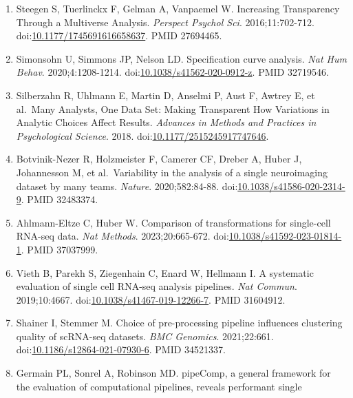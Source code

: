 \documentclass{article}
\begin{document}
\begin{enumerate}
  Simmons JP, Nelson LD, Simonsohn U. False-positive psychology:
  undisclosed flexibility in data collection and analysis allows
  presenting anything as significant. \emph{Psychol Sci}.
  2011;22:1359-66.
  doi:\href{https://doi.org/10.1177/0956797611417632}{10.1177/0956797611417632}.
  PMID 22006061.
\item
  Steegen S, Tuerlinckx F, Gelman A, Vanpaemel W. Increasing
  Transparency Through a Multiverse Analysis. \emph{Perspect Psychol
  Sci}. 2016;11:702-712.
  doi:\href{https://doi.org/10.1177/1745691616658637}{10.1177/1745691616658637}.
  PMID 27694465.
\item
  Simonsohn U, Simmons JP, Nelson LD. Specification curve analysis.
  \emph{Nat Hum Behav}. 2020;4:1208-1214.
  doi:\href{https://doi.org/10.1038/s41562-020-0912-z}{10.1038/s41562-020-0912-z}.
  PMID 32719546.
\item
  Silberzahn R, Uhlmann E, Martin D, Anselmi P, Aust F, Awtrey E, et
  al.~Many Analysts, One Data Set: Making Transparent How Variations in
  Analytic Choices Affect Results. \emph{Advances in Methods and
  Practices in Psychological Science}. 2018.
  doi:\href{https://doi.org/10.1177/2515245917747646}{10.1177/2515245917747646}.
\item
  Botvinik-Nezer R, Holzmeister F, Camerer CF, Dreber A, Huber J,
  Johannesson M, et al.~Variability in the analysis of a single
  neuroimaging dataset by many teams. \emph{Nature}. 2020;582:84-88.
  doi:\href{https://doi.org/10.1038/s41586-020-2314-9}{10.1038/s41586-020-2314-9}.
  PMID 32483374.
\item
  Ahlmann-Eltze C, Huber W. Comparison of transformations for
  single-cell RNA-seq data. \emph{Nat Methods}. 2023;20:665-672.
  doi:\href{https://doi.org/10.1038/s41592-023-01814-1}{10.1038/s41592-023-01814-1}.
  PMID 37037999.
\item
  Vieth B, Parekh S, Ziegenhain C, Enard W, Hellmann I. A systematic
  evaluation of single cell RNA-seq analysis pipelines. \emph{Nat
  Commun}. 2019;10:4667.
  doi:\href{https://doi.org/10.1038/s41467-019-12266-7}{10.1038/s41467-019-12266-7}.
  PMID 31604912.
\item
  Shainer I, Stemmer M. Choice of pre-processing pipeline influences
  clustering quality of scRNA-seq datasets. \emph{BMC Genomics}.
  2021;22:661.
  doi:\href{https://doi.org/10.1186/s12864-021-07930-6}{10.1186/s12864-021-07930-6}.
  PMID 34521337.
\item
  Germain PL, Sonrel A, Robinson MD. pipeComp, a general framework for
  the evaluation of computational pipelines, reveals performant single

\end{enumerate}
\end{document}
